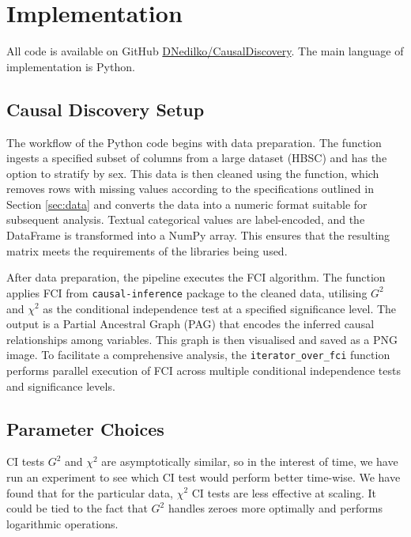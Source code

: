 \documentclass[main.tex]{subfiles}
\begin{document}
\section{Implementation}
All code is available on GitHub \href{https://github.com/DNedilko/CausalDiscoveryProject/tree/244b50fed45bf1547cf7d0a1053891f276ac663b/Project}{DNedilko/CausalDiscovery}. The main language of implementation is Python. 
\subsection{Causal Discovery Setup}
The workflow of the Python code begins with data preparation. The  function ingests a specified subset of columns from a large dataset (HBSC) and has the option to stratify by sex. This data is then cleaned using the  function, which removes rows with missing values according to the specifications outlined in Section \ref{sec:data} and converts the data into a numeric format suitable for subsequent analysis. Textual categorical values are label-encoded, and the DataFrame is transformed into a NumPy array. This ensures that the resulting matrix meets the requirements of the libraries being used.

After data preparation, the pipeline executes the FCI algorithm. The  function applies FCI from \texttt{causal-inference} package to the cleaned data, utilising $G^2$ and $\chi^2$ as the conditional independence test at a specified significance level. The output is a Partial Ancestral Graph (PAG) that encodes the inferred causal relationships among variables. This graph is then visualised and saved as a PNG image. To facilitate a comprehensive analysis, the \texttt{iterator\_over\_fci} function performs parallel execution of FCI across multiple conditional independence tests and significance levels.

\subsection{Parameter Choices}
CI tests $G^2$ and $\chi^2$ are asymptotically similar, so in the interest of time, we have run an experiment to see which CI test would perform better time-wise. We have found that for the particular data, $\chi^2$ CI tests are less effective at scaling. It could be tied to the fact that $G^2$ handles zeroes more optimally and performs logarithmic operations.


\end{document}
